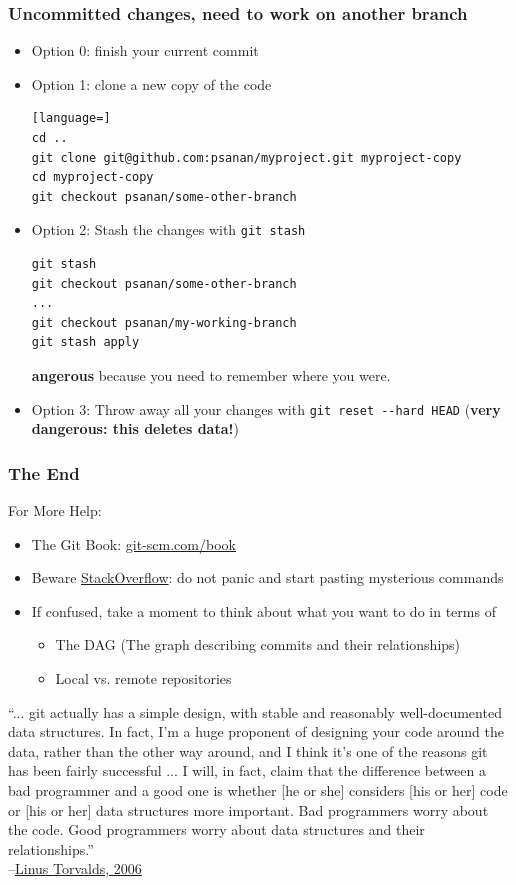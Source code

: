 \begin{frame}[fragile]
\frametitle{Uncommitted changes, need to work on another branch}
\begin{itemize}
\item Option 0: finish your current commit
\item Option 1: clone a new copy of the code
\begin{lstlisting}[language=]
cd ..
git clone git@github.com:psanan/myproject.git myproject-copy
cd myproject-copy
git checkout psanan/some-other-branch
\end{lstlisting}
\item Option 2: Stash the changes with \lstinline{git stash}
\begin{lstlisting}
git stash
git checkout psanan/some-other-branch
...
git checkout psanan/my-working-branch
git stash apply
\end{lstlisting}
\textbf{angerous} because you need to remember where you were.
\item Option 3: Throw away all your changes with \lstinline{git reset --hard HEAD} (\textbf{very dangerous: this deletes data!})
\end{itemize}
\end{frame}

\begin{frame}[fragile]
\frametitle{The End}

For More Help:
\begin{itemize}
\item The Git Book: \href{https://git-scm.com/book}{git-scm.com/book}
\item Beware \href{https://www.stackoverflow.com}{StackOverflow}: do not panic and start pasting mysterious commands
\item If confused, take a moment to think about what you want to do in terms of
  \begin{itemize}
    \item The DAG (The graph describing commits and their relationships)
    \item Local vs. remote repositories
  \end{itemize}
\end{itemize}
\vspace{30px}
{\tiny ``... git actually has a simple design, with stable and reasonably well-documented data structures.
In fact, I'm a huge proponent of designing your code around the data, rather than the other
way around, and I think it's one of the reasons git has been fairly successful ... I will, in
fact, claim that the difference between a bad programmer and a good one is whether [he or she]
considers [his or her] code or [his or her] data structures more important. Bad programmers worry
about the code. Good programmers worry about data structures and their relationships.''\\
--\href{http://lwn.net/Articles/193245/}{Linus Torvalds, 2006}
}
\end{frame}

